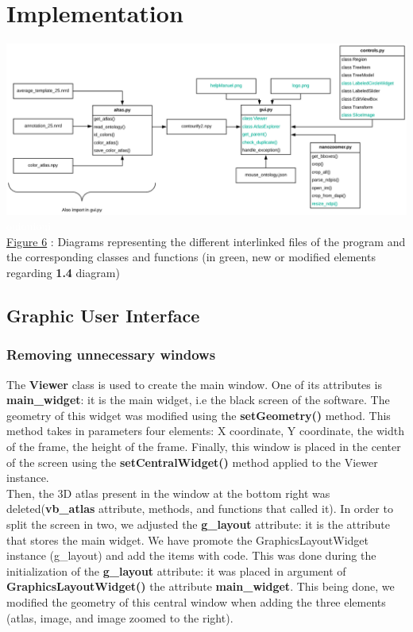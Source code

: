 \documentclass[a4paper,12pt]{report}
\begin{document}
\chapter{Implementation}
\begin{center} \includegraphics[scale=0.46]{newArchitecture.png}
\textcolor{white}{ouiouioui} \\
\underline{Figure 6} : Diagrams representing the different interlinked files of the program and the corresponding classes and functions (in green, new or modified elements regarding \textbf{1.4} diagram)\end{center}

\section{Graphic User Interface}
\subsection{Removing unnecessary windows}
The \textbf{Viewer} class is used to create the main window. One of its attributes is \textbf{main\_widget}: it is the main widget, i.e the black screen of the software. The geometry of this widget was modified using the \textbf{setGeometry()} method. This method takes in parameters four elements: X coordinate, Y coordinate, the width of the frame, the height of the frame. Finally, this window is placed in the center of the screen using the \textbf{setCentralWidget()} method applied to the Viewer instance. \\

Then, the 3D atlas present in the window at the bottom right was deleted(\textbf{vb\_atlas} attribute, methods, and functions that called it). In order to split the screen in two, we adjusted the \textbf{g\_layout} attribute: it is the attribute that stores the main widget. We have promote the GraphicsLayoutWidget instance (g\_layout) and add the items with code. This was done during the initialization of the \textbf{g\_layout} attribute: it was placed in argument of \textbf{GraphicsLayoutWidget()} the attribute \textbf{main\_widget}. This being done, we modified the geometry of this central window when adding the three elements (atlas, image, and image zoomed to the right).\\
\end{document}

